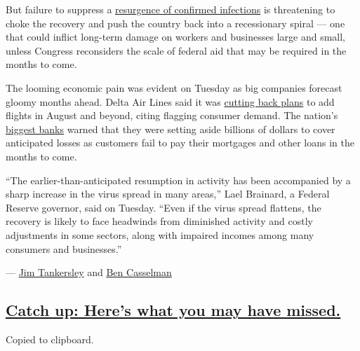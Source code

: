 But failure to suppress a
\href{https://www.nytimes.com/interactive/2020/us/coronavirus-us-cases.html}{resurgence
of confirmed infections} is threatening to choke the recovery and push
the country back into a recessionary spiral --- one that could inflict
long-term damage on workers and businesses large and small, unless
Congress reconsiders the scale of federal aid that may be required in
the months to come.

The looming economic pain was evident on Tuesday as big companies
forecast gloomy months ahead. Delta Air Lines said it was
\href{https://www.cnbc.com/2020/07/14/delta-dal-posts-2q-loss-amid-coronavirus-pandemic.html}{cutting
back plans} to add flights in August and beyond, citing flagging
consumer demand. The nation's
\href{https://www.nytimes.com/2020/07/14/business/big-banks-quarterly-results.html}{biggest
banks} warned that they were setting aside billions of dollars to cover
anticipated losses as customers fail to pay their mortgages and other
loans in the months to come.

``The earlier-than-anticipated resumption in activity has been
accompanied by a sharp increase in the virus spread in many areas,''
Lael Brainard, a Federal Reserve governor, said on Tuesday. ``Even if
the virus spread flattens, the recovery is likely to face headwinds from
diminished activity and costly adjustments in some sectors, along with
impaired incomes among many consumers and businesses.''

--- \href{https://www.nytimes.com/by/jim-tankersley}{Jim Tankersley} and
\href{https://www.nytimes.com/by/ben-casselman}{Ben Casselman}

\hypertarget{catch-up-heres-what-you-may-have-missed}{%
\subsection{\texorpdfstring{\protect\hyperlink{catch-up-heres-what-you-may-have-missed}{Catch
up: Here's what you may have
missed.}}{Catch up: Here's what you may have missed.}}\label{catch-up-heres-what-you-may-have-missed}}

Copied to clipboard.

